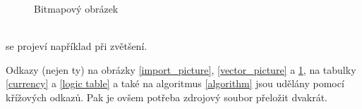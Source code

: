 \documentclass[a4paper,11pt]{article}
\begin{document}
\begin{figure}[h]
{}
\caption{Bitmapový obrázek}
\label{bit_picture}
\end{figure}
\bigskip\\
se projeví například při zvětšení.

Odkazy (nejen ty) na obrázky \ref{import_picture}, \ref{vector_picture} a \ref{bit_picture}, na tabulky \ref{currency} a \ref{logic table} a také na algoritmus \ref{algorithm} jsou udělány pomocí křížových odkazů. Pak je ovšem potřeba zdrojový soubor přeložit dvakrát.
\end{document}
